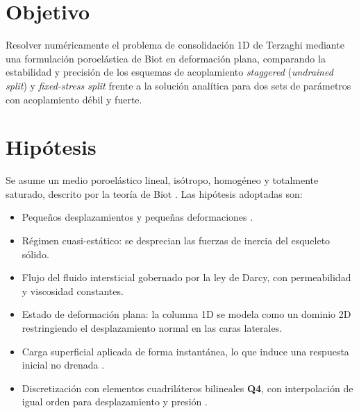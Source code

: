 \documentclass[twocolumn, a4paper]{article}
\title{}
\author{Lucas Paulos - 63116 \and Valentin Neme - 63091}
\begin{document}
 \thispagestyle{firstpage}

    \section{Objetivo}
    Resolver numéricamente el problema de consolidación 1D de Terzaghi mediante
    una formulación poroelástica de Biot en deformación plana, comparando la
    estabilidad y precisión de los esquemas de acoplamiento \textit{staggered}
    (\textit{undrained split}) y \textit{fixed-stress split} frente a la solución
    analítica para dos sets de parámetros con acoplamiento débil y fuerte.

    \section{Hipótesis}
    \quad Se asume un medio poroelástico lineal, isótropo, homogéneo y totalmente
    saturado, descrito por la teoría de Biot \cite{biot1941}. Las hipótesis
    adoptadas son:
    \begin{itemize}\setlength\itemsep{0.1em}
        \item Pequeños desplazamientos y pequeñas deformaciones \cite{cook2002}.
        \item Régimen cuasi-estático: se desprecian las fuerzas de inercia del
        esqueleto sólido.
        \item Flujo del fluido intersticial gobernado por la ley de Darcy, con
        permeabilidad y viscosidad constantes.
        \item Estado de deformación plana: la columna 1D se modela como un dominio
        2D restringiendo el desplazamiento normal en las caras laterales.
        \item Carga superficial aplicada de forma instantánea, lo que induce una
        respuesta inicial no drenada \cite{terzaghi1943}.
        \item Discretización con elementos cuadriláteros bilineales \textbf{Q4},
        con interpolación de igual orden para desplazamiento y presión
        \cite{cook2002}.
    \end{itemize}
\end{document}
